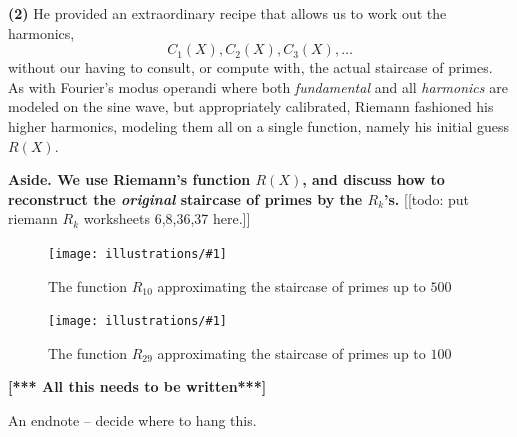 \documentclass[11pt]{article}
\newcommand{\ill}[3]{ 
   \begin{figure}[htbp]
   \begin{center}
   \texttt{[image: illustrations/\#1]}
   \caption{#3}
   \end{center}
    \end{figure}
}
\theoremstyle{plain}
\theoremstyle{definition}
\numberwithin{equation}{section}
\numberwithin{figure}{section}
\numberwithin{table}{section}
\begin{document}
{{\bf (2) }He provided an extraordinary recipe that allows us to work
out the harmonics, $$C_1(X), C_2(X),C_3(X),\dots$$ without our having
to consult, or compute with, the actual staircase of primes. As with
Fourier's modus operandi where both {\em fundamental} and all {\em
  harmonics} are modeled on the sine wave, but appropriately
calibrated, Riemann fashioned his higher harmonics, modeling them all
on a single function, namely his initial guess $R(X)$.
 

{\bf Aside. We use Riemann's function $R(X)$, and discuss how to
  reconstruct the {\em original} staircase of primes by the $R_k$'s.}
[[todo: put riemann $R_k$ worksheets 6,8,36,37 here.]]  \bigskip

\ill{Rk_10_500}{.85}{The function $R_{10}$ approximating the staircase of primes up to $500$}

\ill{Rk_29_100}{.85}{The function $R_{29}$ approximating the staircase of primes up to $100$}


\centerline{\bf [*** All this needs to be written***]}

\bigskip }

An endnote -- decide where to hang this.
\end{document}
